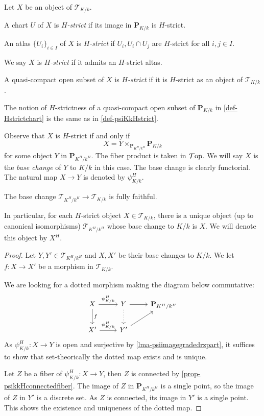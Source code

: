 \begin{definition}\label{def-Hstrictchart}
    Let $X$ be an object of  $\mathcal{T}_{K/k}$. 
    
    A chart
    $U$ of $X$ is \emph{$H$-strict} if its image in $\mathbf{P}_{K/k}$ is $H$-strict.

    An atlas $\{U_i\}_{i\in I}$ of $X$ is \emph{$H$-strict} if $U_i,U_i\cap U_j$ are $H$-strict for all $i,j\in I$.

    We say $X$ is \emph{$H$-strict} if it admits an $H$-strict altas.

    A quasi-compact open subset of $X$ is \emph{$H$-strict} if it is $H$-strict as an object of $\mathcal{T}_{K/k}$.
\end{definition}
The notion of $H$-strictness of a quasi-compact open subset of $\mathbf{P}_{K/k}$ in \cref{def-Hstrictchart} is the same as in \cref{def-psiKkHstrict}.

Observe that $X$ is $H$-strict if and only if 
\[
    X=Y\times_{\mathbf{P}_{K^H/k^H}} \mathbf{P}_{K/k}
\]
for some object $Y$ in $\mathbf{P}_{K^H/k^H}$.
The fiber product is taken in $\mathcal{T}\mathrm{op}$. We will say $X$ is the \emph{base change} of $Y$ to $K/k$ in this case. The base change is clearly functorial.
The natural map $X\rightarrow Y$ is denoted by $\psi_{K/k}^H$.

\begin{proposition}\label{prop-fullyfaithfulTHgradedtoT}
    The base change $\mathcal{T}_{K^H/k^H}\rightarrow \mathcal{T}_{K/k}$ is fully faithful.
\end{proposition}
In particular, for each $H$-strict object $X\in \mathcal{T}_{K/k}$, there is a unique object (up to canonical isomorphisms) $\mathcal{T}_{K^H/k^H}$ whose base change to $K/k$ is $X$. We will denote this object by $X^{H}$.
\begin{proof}
    Let $Y,Y'\in \mathcal{T}_{K^H/k^H}$ and $X,X'$ be their base changes to $K/k$. We let $f:X\rightarrow X'$ be a morphism in $\mathcal{T}_{K/k}$.

    We are looking for a dotted morphism making the diagram below commutative:
    \[
        \begin{tikzcd}
            X \arrow[r, "\psi_{K/k}^H"] \arrow[d, "f"] & Y \arrow[r] \arrow[d, dotted] & \mathbf{P}_{K^H/k^H} \\
            X' \arrow[r, "\psi_{K/k}^H"]               & Y' \arrow[ru]                 &                     
        \end{tikzcd}  
    \]
    As $\psi_{K/k}^H:X\rightarrow Y$ is open and surjective by \cref{lma-psiimagegradedrzpart}, it suffices to show that set-theorically the dotted map exists and is unique. 


    Let $Z$ be a fiber of $\psi_{K/k}^H:X\rightarrow Y$, then $Z$ is connected by \cref{prop-psikkHconnectedfiber}. The image of $Z$ in $\mathbf{P}_{K^H/k^H}$ is a single point, so the image of $Z$ in $Y'$ is a discrete set. As $Z$ is connected, its image in $Y'$ is a single point. This shows the existence and uniqueness of the dotted map.
\end{proof}

